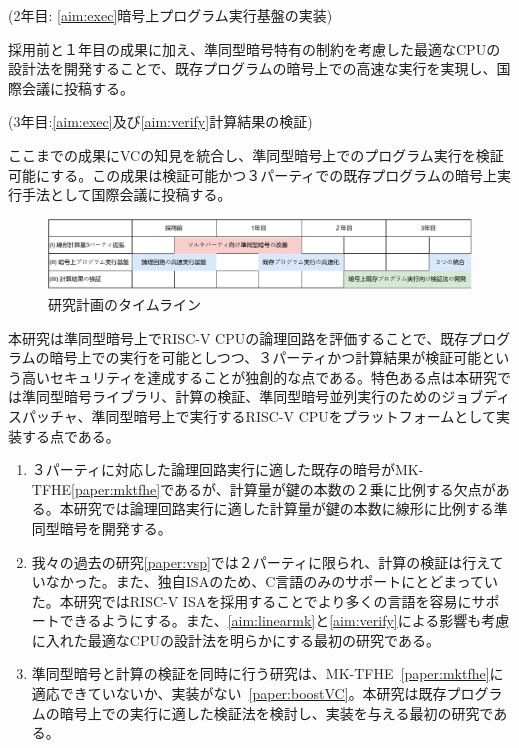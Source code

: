 \noindent(2年目: \ref{aim:exec}暗号上プログラム実行基盤の実装)

採用前と１年目の成果に加え、準同型暗号特有の制約を考慮した最適なCPUの設計法を開発することで、既存プログラムの暗号上での高速な実行を実現し、国際会議に投稿する。

\noindent(3年目:\ref{aim:exec}及び\ref{aim:verify}計算結果の検証)

ここまでの成果にVCの知見を統合し、準同型暗号上でのプログラム実行を検証可能にする。この成果は検証可能かつ３パーティでの既存プログラムの暗号上実行手法として国際会議に投稿する。

\begin{figure}[h]
    \centering
    \includegraphics[width=\linewidth]{figures/schedule.drawio.pdf}
    \vspace*{-1cm}
    \caption{研究計画のタイムライン}
    \label{fig:schedule}
\end{figure}


本研究は準同型暗号上でRISC-V CPUの論理回路を評価することで、既存プログラムの暗号上での実行を可能としつつ、３パーティかつ計算結果が検証可能という高いセキュリティを達成することが独創的な点である。特色ある点は本研究では準同型暗号ライブラリ、計算の検証、準同型暗号並列実行のためのジョブディスパッチャ、準同型暗号上で実行するRISC-V CPUをプラットフォームとして実装する点である。

\begin{enumerate}[label=(\Roman*),leftmargin=1cm]
\setlength{\parskip}{0cm} %
\setlength{\itemsep}{0cm} %
\item	３パーティに対応した論理回路実行に適した既存の暗号がMK-TFHE\ref{paper:mktfhe}であるが、計算量が鍵の本数の２乗に比例する欠点がある。本研究では論理回路実行に適した計算量が鍵の本数に線形に比例する準同型暗号を開発する。

\item	我々の過去の研究\ref{paper:vsp}では２パーティに限られ、計算の検証は行えていなかった。また、独自ISAのため、C言語のみのサポートにとどまっていた。本研究ではRISC-V ISAを採用することでより多くの言語を容易にサポートできるようにする。また、\ref{aim:linearmk}と\ref{aim:verify}による影響も考慮に入れた最適なCPUの設計法を明らかにする最初の研究である。

\item	準同型暗号と計算の検証を同時に行う研究は、MK-TFHE~\ref{paper:mktfhe}に適応できていないか、実装がない~\ref{paper:boostVC}。本研究は既存プログラムの暗号上での実行に適した検証法を検討し、実装を与える最初の研究である。
\end{enumerate}

